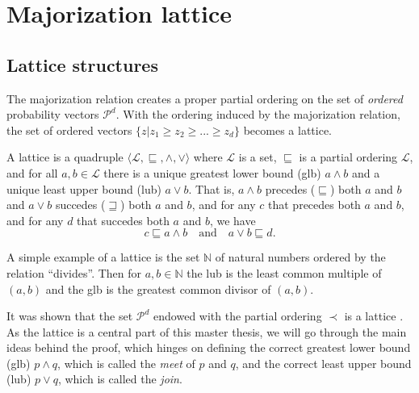 \section{Majorization lattice} \label{sec:majorization_lattice}

\subsection{Lattice structures}

The majorization relation creates a proper partial ordering on the set of \textit{ordered} probability vectors $\mathcal{P}^d$. With the ordering induced by the majorization relation, the set of ordered vectors $\{z | z_1 \geq z_2 \geq ... \geq z_d\}$ becomes a lattice.

\begin{definition}[Lattice] \label{def:lattice} %
    A lattice is a quadruple $\langle \mathcal{L}, \sqsubseteq, \wedge, \vee \rangle$ where $\mathcal{L}$ is a set, $\sqsubseteq$ is a partial ordering $\mathcal{L}$, and for all $a, b \in \mathcal{L}$ there is a unique greatest lower bound (glb) $a \wedge b$ and a unique least upper bound (lub) $a \vee b$. That is, $a \wedge b$ precedes ($\sqsubseteq$) both $a$ and $b$ and $a \vee b$ succedes ($\sqsupseteq$) both $a$ and $b$, and for any $c$ that precedes both $a$ and $b$, and for any $d$ that succedes both $a$ and $b$, we have
    \begin{equation}
        c \sqsubseteq a \wedge b \quad \text{and} \quad a \vee b \sqsubseteq d.
    \end{equation}
\end{definition}

A simple example of a lattice is the set $\mathbb{N}$ of natural numbers ordered by the relation “divides”. Then for $a, b \in \mathbb{N}$ the lub is the least common multiple of $(a, b)$ and the glb is the greatest common divisor of $(a, b)$. %

It was shown that the set $\mathcal{P}^d$ endowed with the partial ordering $\prec$ is a lattice \cite{cicalese_supermodularity_2002}. As the lattice is a central part of this master thesis, we will go through the main ideas behind the proof, which hinges on defining the correct greatest lower bound (glb) $p \wedge q$, which is called the \textit{meet} of $p$ and $q$, and the correct least upper bound (lub) $p \vee q$, which is called the \textit{join}.

